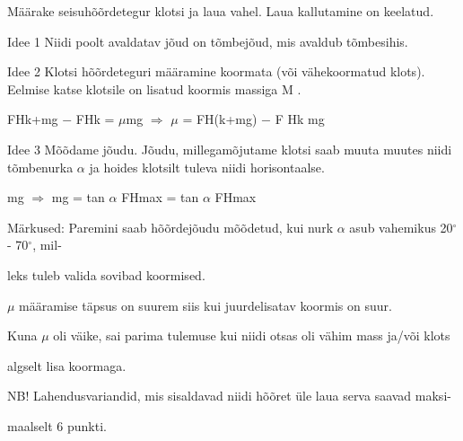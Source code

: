 
Määrake seisuhõõrdetegur klotsi ja laua vahel. Laua kallutamine on keelatud.

\hint

\solu
Idee 1 Niidi poolt avaldatav jõud on tõmbejõud, mis avaldub tõmbesihis.

Idee 2 Klotsi hõõrdeteguri määramine koormata (või vähekoormatud klots). Eelmise katse klotsile on lisatud koormis massiga M .

FHk+mg $-$ FHk = $\mu$mg $\Rightarrow$ $\mu$ = FH(k+mg) $-$ F Hk mg

Idee 3 Mõõdame jõudu. Jõudu, millegamõjutame klotsi saab muuta muutes niidi tõmbenurka $\alpha$ ja hoides klotsilt tuleva niidi horisontaalse.

mg $\Rightarrow$ mg = tan $\alpha$ FHmax = tan $\alpha$ FHmax

Märkused: Paremini saab hõõrdejõudu mõõdetud, kui nurk $\alpha$ asub vahemikus 20$^\circ$ - 70$^\circ$, mil-

leks tuleb valida sovibad koormised.

$\mu$ määramise täpsus on suurem siis kui juurdelisatav koormis on suur.

Kuna $\mu$ oli väike, sai parima tulemuse kui niidi otsas oli vähim mass ja/või klots

algselt lisa koormaga.

NB! Lahendusvariandid, mis sisaldavad niidi hõõret üle laua serva saavad maksi-

maalselt 6 punkti.
\probend
